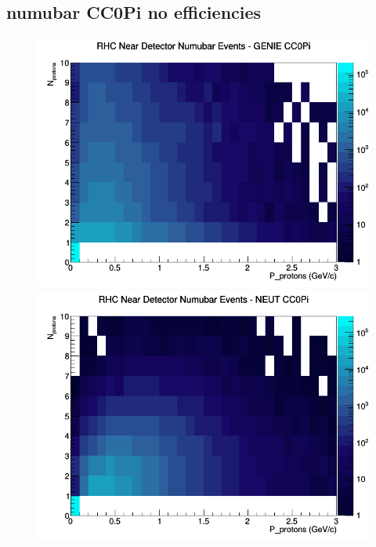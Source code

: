 \subsection{numubar CC0Pi no efficiencies}
\begin{figure}[h]
\includegraphics[width=\linewidth]{N_P/nominal/protons/CC0Pi_RHC_ND_numubar_N_P_GENIE.png}
\endminipage
{}
\includegraphics[width=\linewidth]{N_P/nominal/protons/CC0Pi_RHC_ND_numubar_N_P_NEUT.png}
\endminipage
{}

\end{figure}
